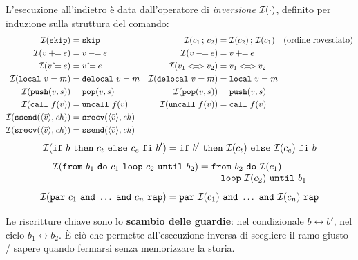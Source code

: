 L'esecuzione all'indietro è data dall'operatore di \emph{inversione}
$\mathcal{I}(\cdot)$, definito per induzione sulla struttura del comando:
{\small
\begin{align*}
\Inv{\mathtt{skip}} &= \mathtt{skip} &
\Inv{c_1\,;\,c_2} &= \Inv{c_2}\,;\,\Inv{c_1} \quad \text{(ordine rovesciato)}\\
\Inv{v \mathbin{+\!\!=} e} &= v \mathbin{-\!\!=} e &
\Inv{v \mathbin{-\!\!=} e} &= v \mathbin{+\!\!=} e \\
\Inv{v \mathbin{\hat{}\!=} e} &= v \mathbin{\hat{}\!=} e &
\Inv{v_1 \mathbin{<\!=\!>} v_2} &= v_1 \mathbin{<\!=\!>} v_2 \\
\Inv{\mathtt{local}\ v = m} &= \mathtt{delocal}\ v = m &
\Inv{\mathtt{delocal}\ v = m} &= \mathtt{local}\ v = m \\
\Inv{\mathtt{push}(v,s)} &= \mathtt{pop}(v,s) &
\Inv{\mathtt{pop}(v,s)} &= \mathtt{push}(v,s) \\
\Inv{\mathtt{call}\ f(\bar v)} &= \mathtt{uncall}\ f(\bar v) &
\Inv{\mathtt{uncall}\ f(\bar v)} &= \mathtt{call}\ f(\bar v) \\
\Inv{\mathtt{ssend}(\langle \bar v \rangle, \mathit{ch})} &= \mathtt{srecv}(\langle \bar v \rangle, \mathit{ch}) \\
\Inv{\mathtt{srecv}(\langle \bar v \rangle, \mathit{ch})} &= \mathtt{ssend}(\langle \bar v \rangle, \mathit{ch})
\end{align*}
}
\[
\Inv{\mathtt{if}\ b\ \mathtt{then}\ c_t\ \mathtt{else}\ c_e\ \mathtt{fi}\ b'}
   = \mathtt{if}\ b'\ \mathtt{then}\ \Inv{c_t}\ \mathtt{else}\ \Inv{c_e}\ \mathtt{fi}\ b
\]
\[
\Inv{\mathtt{from}\ b_1\ \mathtt{do}\ c_1\ \mathtt{loop}\ c_2\ \mathtt{until}\ b_2}
   = \begin{array}[t]{@{}l@{}}\mathtt{from}\ b_2\ \mathtt{do}\ \Inv{c_1}\\ \quad\mathtt{loop}\ \Inv{c_2}\ \mathtt{until}\ b_1\end{array}
\]
\[
\Inv{\mathtt{par}\ c_1\ \mathtt{and}\ \dots\ \mathtt{and}\ c_n\ \mathtt{rap}}
   = \mathtt{par}\ \Inv{c_1}\ \mathtt{and}\ \dots\ \mathtt{and}\ \Inv{c_n}\ \mathtt{rap}
\]

\noindent
Le riscritture chiave sono lo \textbf{scambio delle guardie}: nel condizionale
$b \leftrightarrow b'$, nel ciclo $b_1 \leftrightarrow b_2$. È ciò che permette
all'esecuzione inversa di scegliere il ramo giusto / sapere quando fermarsi
senza memorizzare la storia.

